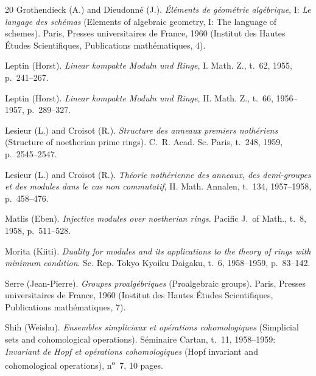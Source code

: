 \begin{thebibliography}{20}
Grothendieck (A.) and Dieudonné (J.). \emph{Éléments de géométrie
algébrique}, I: \emph{Le langage des schémas} (Elements of algebraic
geometry, I: The language of schemes). Paris, Presses universitaires de
France, 1960 (Institut des Hautes Études Scientifiques, Publications
mathématiques, 4).

Leptin (Horst). \emph{Linear kompakte Moduln und Ringe}, I. Math. Z.,
t.~62, 1955, p.~241--267.

Leptin (Horst). \emph{Linear kompakte Moduln und Ringe}, II. Math. Z.,
t.~66, 1956--1957, p.~289--327.

Lesieur (L.) and Croisot (R.). \emph{Structure des anneaux premiers
nothériens} (Structure of noetherian prime rings). C.~R. Acad. Sc. Paris,
t.~248, 1959, p.~2545--2547.

Lesieur (L.) and Croisot (R.). \emph{Théorie nothérienne des anneaux, des
demi-groupes et des modules dans le cas non commutatif}, II. Math. Annalen,
t.~134, 1957--1958, p.~458--476.

Matlis (Eben). \emph{Injective modules over noetherian rings}. Pacific
J.~of Math., t.~8, 1958, p.~511--528.

Morita (Kiiti). \emph{Duality for modules and its applications to the theory
of rings with minimum condition}. Sc. Rep. Tokyo Kyoiku Daigaku, t.~6,
1958--1959, p.~83--142.

Serre (Jean-Pierre). \emph{Groupes proalgébriques} (Proalgebraic groups).
Paris, Presses universitaires de France, 1960 (Institut des Hautes Études
Scientifiques, Publications mathématiques, 7).

Shih (Weishu). \emph{Ensembles simpliciaux et opérations cohomologiques}
(Simplicial sets and cohomological operations). Séminaire Cartan,
t.~11, 1958--1959: \emph{Invariant de Hopf et opérations cohomologiques}
(Hopf invariant and cohomological operations), n\textsuperscript{o}~7,
10 pages.

\end{thebibliography}